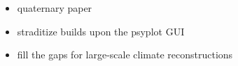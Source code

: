 

\label{chp:straditize}


\begin{itemize}
	\item quaternary paper
	\item straditize builds upon the psyplot GUI
    \item fill the gaps for large-scale climate reconstructions
\end{itemize}
